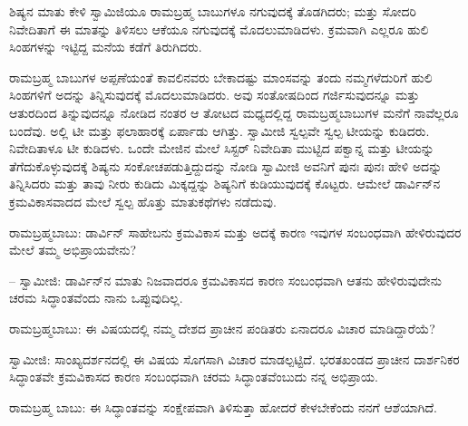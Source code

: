 ಶಿಷ್ಯನ ಮಾತು ಕೇಳಿ ಸ್ವಾಮಿಜಿಯೂ ರಾಮಬ್ರಹ್ಮ ಬಾಬುಗಳೂ ನಗುವುದಕ್ಕೆ ತೊಡಗಿದರು; ಮತ್ತು ಸೋದರಿ ನಿವೇದಿತಾಗೆ ಈ ಮಾತನ್ನು ತಿಳಿಸಲು ಆಕೆಯೂ ನಗುವುದಕ್ಕೆ ಮೊದಲುಮಾಡಿದಳು. ಕ್ರಮವಾಗಿ ಎಲ್ಲರೂ ಹುಲಿ ಸಿಂಹಗಳನ್ನು ಇಟ್ಟಿದ್ದ ಮನೆಯ ಕಡೆಗೆ ತಿರುಗಿದರು.

ರಾಮಬ್ರಹ್ಮ ಬಾಬುಗಳ ಅಪ್ಪಣೆಯಂತೆ ಕಾವಲಿನವರು ಬೇಕಾದಷ್ಟು ಮಾಂಸವನ್ನು ತಂದು ನಮ್ಮಗಳೆದುರಿಗೆ ಹುಲಿ ಸಿಂಹಗಳಿಗೆ ಅದನ್ನು ತಿನ್ನಿಸುವುದಕ್ಕೆ ಮೊದಲುಮಾಡಿದರು. ಅವು ಸಂತೋಷದಿಂದ ಗರ್ಜಿಸುವುದನ್ನೂ ಮತ್ತು ಆತುರದಿಂದ ತಿನ್ನುವುದನ್ನೂ ನೋಡಿದ ನಂತರ ಆ ತೋಟದ ಮಧ್ಯದಲ್ಲಿದ್ದ ರಾಮಬ್ರಹ್ಮಬಾಬುಗಳ ಮನೆಗೆ ನಾವೆಲ್ಲರೂ ಬಂದೆವು. ಅಲ್ಲಿ ಟೀ ಮತ್ತು ಫಲಾಹಾರಕ್ಕೆ ಏರ್ಪಾಡು ಆಗಿತ್ತು. ಸ್ವಾಮೀಜಿ ಸ್ವಲ್ಪವೇ ಸ್ವಲ್ಪ ಟೀಯನ್ನು ಕುಡಿದರು. ನಿವೇದಿತಾಳೂ ಟೀ ಕುಡಿದಳು. ಒಂದೇ ಮೇಜಿನ ಮೇಲೆ ಸಿಸ್ಟರ್ ನಿವೇದಿತಾ ಮುಟ್ಟಿದ ಪಕ್ವಾನ್ನ ಮತ್ತು ಟೀಯನ್ನು ತೆಗೆದುಕೊಳ್ಳುವುದಕ್ಕೆ ಶಿಷ್ಯನು ಸಂಕೋಚಪಡುತ್ತಿದ್ದುದನ್ನು ನೋಡಿ ಸ್ವಾಮೀಜಿ ಅವನಿಗೆ ಪುನಃ ಪುನಃ ಹೇಳಿ ಅದನ್ನು ತಿನ್ನಿಸಿದರು ಮತ್ತು ತಾವು ನೀರು ಕುಡಿದು ಮಿಕ್ಕದ್ದನ್ನು ಶಿಷ್ಯನಿಗೆ ಕುಡಿಯುವುದಕ್ಕೆ ಕೊಟ್ಟರು. ಆಮೇಲೆ ಡಾರ್ವಿನ್‌ನ ಕ್ರಮವಿಕಾಸವಾದದ ಮೇಲೆ ಸ್ವಲ್ಪ ಹೊತ್ತು ಮಾತುಕಥೆಗಳು ನಡೆದುವು.

ರಾಮಬ್ರಹ್ಮಬಾಬು: ಡಾರ್ವಿನ್ ಸಾಹೇಬನು ಕ್ರಮವಿಕಾಸ ಮತ್ತು ಅದಕ್ಕೆ ಕಾರಣ ಇವುಗಳ ಸಂಬಂಧವಾಗಿ ಹೇಳಿರುವುದರ ಮೇಲೆ ತಮ್ಮ ಅಭಿಪ್ರಾಯವೇನು?

– ಸ್ವಾಮೀಜಿ: ಡಾರ್ವಿನ್‌ನ ಮಾತು ನಿಜವಾದರೂ ಕ್ರಮವಿಕಾಸದ ಕಾರಣ ಸಂಬಂಧವಾಗಿ ಆತನು ಹೇಳಿರುವುದೇನು ಚರಮ ಸಿದ್ಧಾಂತವೆಂದು ನಾನು ಒಪ್ಪುವುದಿಲ್ಲ.

ರಾಮಬ್ರಹ್ಮಬಾಬು: ಈ ವಿಷಯದಲ್ಲಿ ನಮ್ಮ ದೇಶದ ಪ್ರಾಚೀನ ಪಂಡಿತರು ಏನಾದರೂ ವಿಚಾರ ಮಾಡಿದ್ದಾರೆಯೆ?

ಸ್ವಾಮೀಜಿ: ಸಾಂಖ್ಯದರ್ಶನದಲ್ಲಿ ಈ ವಿಷಯ ಸೊಗಸಾಗಿ ವಿಚಾರ ಮಾಡಲ್ಪಟ್ಟಿದೆ. ಭರತಖಂಡದ ಪ್ರಾಚೀನ ದಾರ್ಶನಿಕರ ಸಿದ್ಧಾಂತವೇ ಕ್ರಮವಿಕಾಸದ ಕಾರಣ ಸಂಬಂಧವಾಗಿ ಚರಮ ಸಿದ್ಧಾಂತವೆಂಬುದು ನನ್ನ ಅಭಿಪ್ರಾಯ.

ರಾಮಬ್ರಹ್ಮ ಬಾಬು: ಈ ಸಿದ್ಧಾಂತವನ್ನು ಸಂಕ್ಷೇಪವಾಗಿ ತಿಳಿಸುತ್ತಾ ಹೋದರೆ ಕೇಳಬೇಕೆಂದು ನನಗೆ ಆಶೆಯಾಗಿದೆ.

